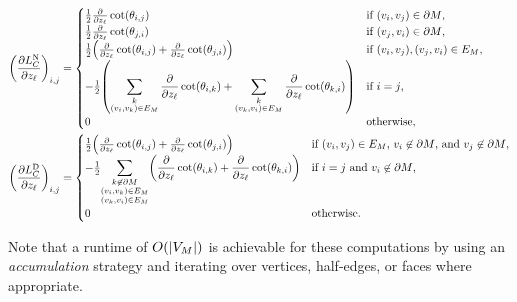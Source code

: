 \begin{align*}
	\pof{\frac{\partial L_C^{\text{N}}}{\partial z_\ell}}_{i, j} &= \begin{cases}
		\frac{1}{2}\frac{\partial}{\partial z_\ell}\cot\pof{\theta_{i, j}} & \text{if \(\pof{v_i, v_j} \in \partial M\)}, \\
		\frac{1}{2}\frac{\partial}{\partial z_\ell}\cot\pof{\theta_{j, i}} & \text{if \(\pof{v_j, v_i} \in \partial M\)}, \\
		\frac{1}{2}\pof{\frac{\partial}{\partial z_\ell}\cot\pof{\theta_{i, j}} + \frac{\partial}{\partial z_\ell}\cot\pof{\theta_{j, i}}} & \text{if \(\pof{v_i, v_j}, \pof{v_j, v_i} \in E_M\)}, \\
		-\frac{1}{2}\pof{\displaystyle\sum_{\substack{k \\ \pof{v_i, v_k} \in E_M}}\frac{\partial}{\partial z_\ell}\cot\pof{\theta_{i, k}} + \sum_{\substack{k \\ \pof{v_k, v_i} \in E_M}}\frac{\partial}{\partial z_\ell}\cot\pof{\theta_{k, i}}} & \text{if \(i = j\)}, \\
		0 & \text{otherwise},
	\end{cases} \\
	\pof{\frac{\partial L_C^{\text{D}}}{\partial z_\ell}}_{i, j} &= \begin{cases}
		\frac{1}{2}\pof{\frac{\partial}{\partial z_\ell}\cot\pof{\theta_{i, j}} + \frac{\partial}{\partial z_\ell}\cot\pof{\theta_{j, i}}} & \text{if \(\pof{v_i, v_j} \in E_M\), \(v_i \not\in \partial M\), and \(v_j \not\in \partial M\)}, \\
		-\frac{1}{2}{\displaystyle\sum_{\substack{k \not\in \partial M \\ \pof{v_i, v_k} \in E_M \\ \pof{v_k, v_i} \in E_M}}\pof{\frac{\partial}{\partial z_\ell}\cot\pof{\theta_{i, k}} + \frac{\partial}{\partial z_\ell}\cot\pof{\theta_{k, i}}}} & \text{if \(i = j\) and \(v_i \not\in \partial M\)}, \\
		0 & \text{otherwise}.
	\end{cases}
\end{align*}

Note that a runtime of \(O\pof{\abs{V_M}}\) is achievable for these computations by using an \emph{accumulation} strategy and iterating over vertices, half-edges, or faces where appropriate.
